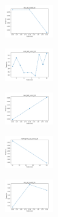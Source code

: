 \begin{figure}[H]    
    \centering
    \begin{subfigure}
        \centering
        \includegraphics[width=0.234\textwidth]{img/copkm/iris_set_const_10_949004259_time.png}
    \end{subfigure}
    \hfill
    \begin{subfigure}
        \centering
        \includegraphics[width=0.234\textwidth]{img/copkm/ecoli_set_const_10_949004259_time.png}
    \end{subfigure}
    \hfill
    \begin{subfigure}
        \centering
        \includegraphics[width=0.234\textwidth]{img/copkm/rand_set_const_10_949004259_time.png}
    \end{subfigure}
    \hfill
    \begin{subfigure}
        \centering
        \includegraphics[width=0.234\textwidth]{img/copkm/newthyroid_set_const_10_949004259_time.png}
    \end{subfigure}
    \hfill
    \begin{subfigure}
        \centering
        \includegraphics[width=0.234\textwidth]{img/copkm/iris_set_const_10_589741062_time.png}
    \end{subfigure}
    \hfill

\end{figure}
